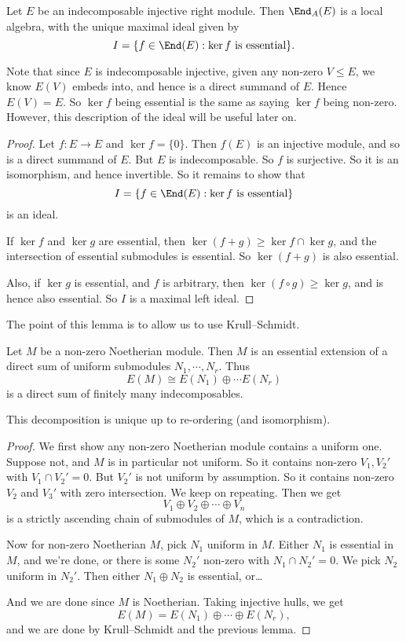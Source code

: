 \documentclass[a4paper]{article}
\begin{document}
\begin{lemma}
  Let $E$ be an indecomposable injective right module. Then $\End_A(E)$ is a local algebra, with the unique maximal ideal given by
  \[
    I = \{f \in \End(E): \ker f\text{ is essential}\}.
  \]
\end{lemma}
Note that since $E$ is indecomposable injective, given any non-zero $V \leq E$, we know $E(V)$ embeds into, and hence is a direct summand of $E$. Hence $E(V) = E$. So $\ker f$ being essential is the same as saying $\ker f$ being non-zero. However, this description of the ideal will be useful later on.

\begin{proof}
  Let $f: E \to E$ and $\ker f = \{0\}$. Then $f(E)$ is an injective module, and so is a direct summand of $E$. But $E$ is indecomposable. So $f$ is surjective. So it is an isomorphism, and hence invertible. So it remains to show that
  \[
    I = \{f \in \End(E): \ker f\text{ is essential}\}
  \]
  is an ideal.

  If $\ker f$ and $\ker g$ are essential, then $\ker (f + g) \geq \ker f \cap \ker g$, and the intersection of essential submodules is essential. So $\ker (f + g)$ is also essential.

  Also, if $\ker g$ is essential, and $f$ is arbitrary, then $\ker (f \circ g) \geq \ker g$, and is hence also essential. So $I$ is a maximal left ideal.
\end{proof}

The point of this lemma is to allow us to use Krull--Schmidt.

\begin{lemma}
  Let $M$ be a non-zero Noetherian module. Then $M$ is an essential extension of a direct sum of uniform submodules $N_1, \cdots, N_r$. Thus
  \[
    E(M) \cong E(N_1) \oplus \cdots E(N_r)
  \]
  is a direct sum of finitely many indecomposables.

  This decomposition is unique up to re-ordering (and isomorphism).
\end{lemma}

\begin{proof}
  We first show any non-zero Noetherian module contains a uniform one. Suppose not, and $M$ is in particular not uniform. So it contains non-zero $V_1, V_2'$ with $V_1 \cap V_2' = 0$. But $V_2'$ is not uniform by assumption. So it contains non-zero $V_2$ and $V_3'$ with zero intersection. We keep on repeating. Then we get
  \[
    V_1 \oplus V_2 \oplus \cdots \oplus V_n
  \]
  is a strictly ascending chain of submodules of $M$, which is a contradiction.

  Now for non-zero Noetherian $M$, pick $N_1$ uniform in $M$. Either $N_1$ is essential in $M$, and we're done, or there is some $N_2'$ non-zero with $N_1 \cap N_2' = 0$. We pick $N_2$ uniform in $N_2'$. Then either $N_1 \oplus N_2$ is essential, or\ldots

  And we are done since $M$ is Noetherian. Taking injective hulls, we get
  \[
    E(M) = E(N_1) \oplus \cdots \oplus E(N_r),
  \]
  and we are done by Krull--Schmidt and the previous lemma.
\end{proof}
\end{document}
